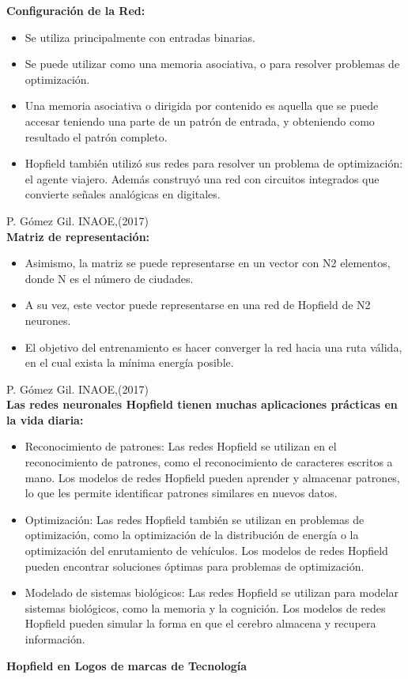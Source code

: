 \documentclass{article}
\begin{document}
\textbf{Configuración de la Red:}
\begin{itemize}
    \item Se utiliza principalmente con entradas binarias.
    \item Se puede utilizar como una memoria asociativa, o para
resolver problemas de optimización.
    \item Una memoria asociativa o dirigida por contenido es
aquella que se puede accesar teniendo una parte de un
patrón de entrada, y obteniendo como resultado el
patrón completo.
    \item Hopfield también utilizó sus redes para resolver un
problema de optimización: el agente viajero. Además
construyó una red con circuitos integrados que convierte
señales analógicas en digitales. 
\end{itemize}
\textsf{P. Gómez Gil. INAOE,(2017)}
\\
\newpage
\textbf{Matriz de representación:}
\begin{itemize}
    \item Asimismo, la matriz se puede representarse
en un vector con N2 elementos, donde N es
el número de ciudades.
    \item A su vez, este vector puede representarse en
una red de Hopfield de N2 neurones.
    \item El objetivo del entrenamiento es hacer
converger la red hacia una ruta válida, en el
cual exista la mínima energía posible.  
\end{itemize}
\textsf{P. Gómez Gil. INAOE,(2017)}
\\



\textbf{Las redes neuronales Hopfield tienen muchas aplicaciones
prácticas en la vida diaria:}
\begin{itemize}
    \item Reconocimiento de patrones: Las redes Hopfield se utilizan en el reconocimiento de patrones, como el reconocimiento de caracteres escritos a mano. Los modelos de redes Hopfield pueden aprender y almacenar patrones, lo que les permite identificar patrones similares en nuevos datos.
    \item Optimización: Las redes Hopfield también se utilizan en problemas de optimización, como la optimización de la distribución de energía o la optimización del enrutamiento de vehículos. Los modelos de redes Hopfield pueden encontrar soluciones óptimas para problemas de optimización.
    \item Modelado de sistemas biológicos: Las redes Hopfield se utilizan para modelar sistemas biológicos, como la memoria y la cognición. Los modelos de redes Hopfield pueden simular la forma en que el cerebro almacena y recupera información.
\end{itemize}
\textbf{Hopfield en Logos de marcas de Tecnología}
\\
\end{document}
